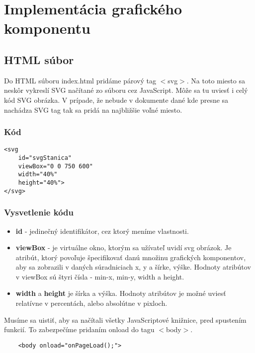 \chapter{Implementácia grafického komponentu}

\section{HTML súbor}
Do HTML súboru index.html pridáme párový tag $<$svg$>$. Na toto miesto sa neskôr vykreslí SVG načítané zo súboru cez JavaScript. Môže sa tu uviesť i celý kód SVG obrázka. V prípade, že nebude v dokumente dané kde presne sa nachádza SVG tag tak sa pridá na najbližšie voľné miesto. 
\subsection{Kód}
\begin{lstlisting}
<svg 
	id="svgStanica" 
	viewBox="0 0 750 600" 
	width="40%" 
	height="40%"> 
</svg>
\end{lstlisting}

\subsection{Vysvetlenie kódu}
\begin{itemize}
\item  \textbf{id} - jedinečný identifikátor, cez ktorý meníme vlastnosti.
\item 	\textbf{viewBox} - je virtuálne okno, ktorým sa užívateľ uvidí svg obrázok. Je atribút, ktorý povoľuje špecifikovať danú množinu grafických komponentov, aby sa zobrazili v daných súradniciach x, y a šírke, výške. Hodnoty atribútov v viewBox sú štyri čísla - min-x, min-y, width a height. 
\item 	\textbf{width} a \textbf{height} je šírka a výška. Hodnoty atribútov je možné uviesť relatívne v percentách, alebo absolútne v pixloch. 
\end{itemize}

Musíme sa uistiť, aby sa načítali všetky JavaScriptové knižnice, pred spustením funkcií. To zabezpečíme pridaním  onload do tagu $<$body$>$. 
\begin{lstlisting}
	<body onload="onPageLoad();">
\end{lstlisting}

